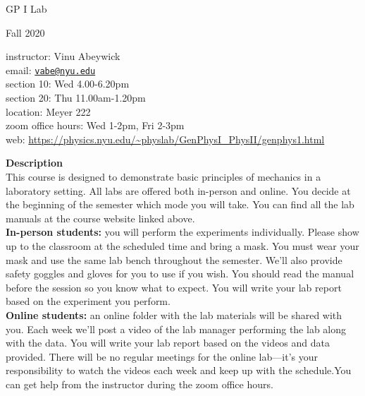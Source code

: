 \documentclass[11pt]{extarticle}
\begin{document}
\setlength{\parindent}{0pt}

\begin{center}
	\huge 
	GP I Lab

	\vspace{0.5cm}
	\large 
	Fall 2020
\end{center}

\begin{adjustwidth}{0.5cm}{}
	instructor: Vinu Abeywick \\ 
	email: \href{mailto:vabe@nyu.edu}{\texttt{vabe@nyu.edu}} \\ 
	section 10: Wed 4.00-6.20pm \\ 
	section 20: Thu 11.00am-1.20pm \\ 
	location: Meyer 222 \\ 
	zoom office hours: Wed 1-2pm, Fri 2-3pm \\  
	web: \url{https://physics.nyu.edu/~physlab/GenPhysI_PhysII/genphys1.html}
\end{adjustwidth}

\hfill 

{\bf \Large Description} \\ 

This course is designed to demonstrate basic principles of mechanics in a laboratory setting. All labs are offered both in-person and online. You decide at the beginning of the semester which mode you will take. You can find all the lab manuals at the course website linked above. \\ 

{\bf In-person students:} you will perform the experiments individually. Please show up to the classroom at the scheduled time and bring a mask. You must wear your mask and use the same lab bench throughout the semester. We'll also provide safety goggles and gloves for you to use if you wish. You should read the manual before the session so you know what to expect. You will write your lab report based on the experiment you perform. \\ 

{\bf Online students:} an online folder with the lab materials will be shared with you. Each week we'll post a video of the lab manager performing the lab along with the data. You will write your lab report based on the videos and data provided. There will be no regular meetings for the online lab---it's your responsibility to watch the videos each week and keep up with the schedule.You can get help from the instructor during the zoom office hours. \\  
\end{document}

